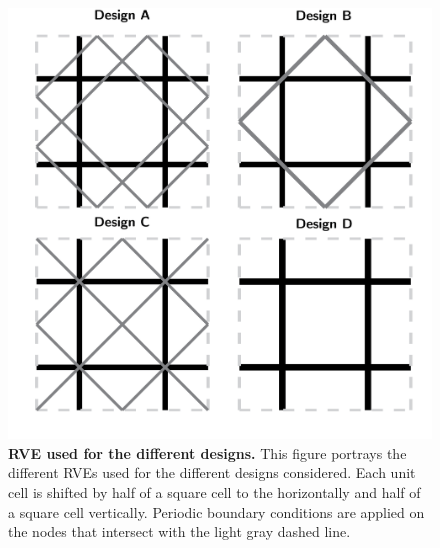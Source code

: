 \documentclass[10pt,twoside]{fernandes_supp}
\newcommand{\mf}[1]{\colorbox{blue!10}{\color{color3}#1}}
\begin{document}




\begin{figure}
    \centering
	\includegraphics[width=0.6\linewidth]{SFig10.png}
	\caption{{\bf RVE used for the different designs.} This figure portrays the different RVEs used for the different designs considered. Each unit cell is shifted by half of a square cell to the horizontally and half of a square cell  vertically. Periodic boundary conditions are applied on the nodes that intersect with the light gray dashed line.}
	\label{RVE}
\end{figure}
\end{document}
